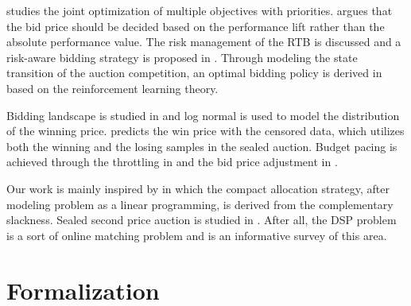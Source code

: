 \documentclass{article}
\begin{document}
\cite{Joint2016} studies the joint optimization of multiple objectives with priorities.
\cite{Lift2016} argues that the bid price should be decided
    based on the performance lift rather than the absolute performance value.
The risk management of the RTB is discussed and a risk-aware bidding strategy is proposed in \cite{Risk2017}.
Through modeling the state transition of the auction competition,
    an optimal bidding policy is derived in \cite{Reinforce2017} based on the reinforcement learning theory.


Bidding landscape is studied in \cite{YingCui2011} and log normal is used to model the distribution of the winning price.
\cite{Wu2015} predicts the win price with the censored data, which utilizes both the winning and the losing samples in the sealed auction.
Budget pacing is achieved through the throttling in \cite{Throttle2015} and the bid price adjustment in \cite{Pacing2013}.

Our work is mainly inspired by \cite{YeChen2011} in which the compact allocation strategy,
    after modeling problem as a linear programming, is derived from the complementary slackness.
Sealed second price auction is studied in \cite{SSPA1961}.
After all, the DSP problem is a sort of online matching problem and \cite{Mehta} is an informative survey of this area.

\section{Formalization} \label{Formalization}
\end{document}
